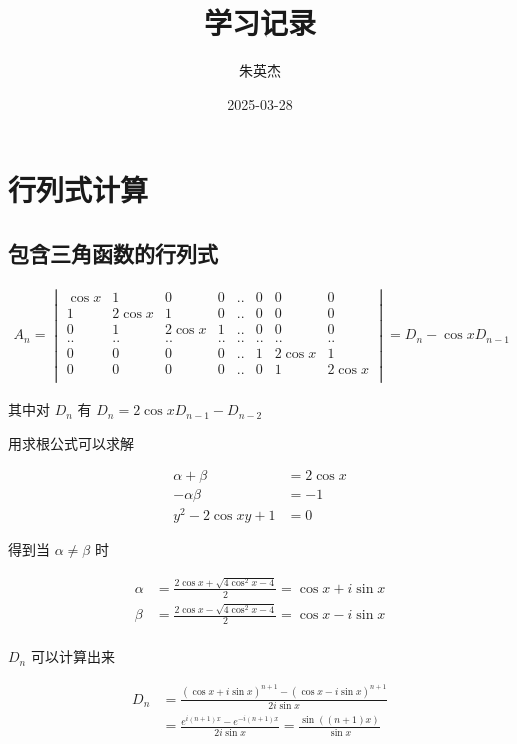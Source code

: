 \documentclass[12pt,a4paper]{ctexart}
\title{学习记录}
\author{朱英杰}
\date{2025-03-28}
\begin{document}
\maketitle
\tableofcontents

\section{行列式计算}

\subsection{包含三角函数的行列式}

\begin{align*}
    A_n = \begin{vmatrix}
        \cos x & 1 & 0 & 0 & .. & 0 & 0 & 0 \\
        1 & 2\cos x & 1 & 0 & .. & 0 & 0 & 0 \\
        0 & 1 & 2 \cos x & 1 &  .. & 0 & 0 & 0\\
        .. & .. &.. &.. &.. &.. &.. & .. \\
        0 & 0 & 0  & 0 &  .. & 1 & 2 \cos x & 1\\
        0 & 0 & 0  & 0 &  .. & 0 & 1 & 2 \cos x\\
    \end{vmatrix} =  D_n - \cos x D_{n-1}
\end{align*}

其中对 $D_n$ 有 $D_n = 2 \cos x D_{n-1} - D_{n-2}$

用求根公式可以求解

\begin{align*}
\alpha + \beta &= 2 \cos x \\
-\alpha \beta &= -1 \\
y^2 - 2 \cos x y + 1 & = 0 
\end{align*}

得到当 $\alpha \ne \beta$ 时

\begin{align*}
\alpha &= \frac{2 \cos x + \sqrt{4 \cos^2 x - 4}}{2} = \cos x + i \sin x \\
\beta &= \frac{2 \cos x - \sqrt{4 \cos^2 x - 4}}{2} = \cos x - i \sin x \\
\end{align*}

$D_n$ 可以计算出来

\begin{align*}
    D_n &= \frac{ (\cos x + i \sin x)^{n+1} - (\cos x - i \sin x)^{n+1} }{2 i \sin x} \\
    &= \frac{e^{i(n+1)x}  - e^{-i(n+1)x}}{2 i \sin x} = \frac{\sin ((n+1)x)}{ \sin x}
\end{align*}
\end{document}
